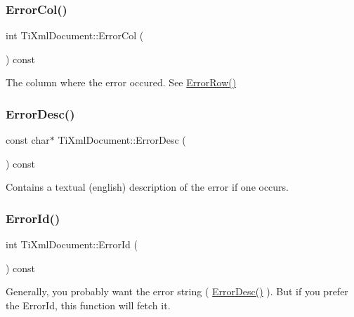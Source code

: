 \subsubsection{\texorpdfstring{Error\+Col()}{ErrorCol()}}
{\footnotesize\ttfamily int Ti\+Xml\+Document\+::\+Error\+Col (\begin{DoxyParamCaption}{ }\end{DoxyParamCaption}) const\hspace{0.3cm}{\ttfamily [inline]}}



The column where the error occured. See \hyperlink{class_ti_xml_document_a062e5257128a7da31b0b2e38cd524600}{Error\+Row()} 

\mbox{\label{class_ti_xml_document_aab511be262e84a003e3bb86f0215c8c2}} 
\subsubsection{\texorpdfstring{Error\+Desc()}{ErrorDesc()}}
{\footnotesize\ttfamily const char$\ast$ Ti\+Xml\+Document\+::\+Error\+Desc (\begin{DoxyParamCaption}{ }\end{DoxyParamCaption}) const\hspace{0.3cm}{\ttfamily [inline]}}



Contains a textual (english) description of the error if one occurs. 

\mbox{\label{class_ti_xml_document_abd928b49a646c8ed53e0453c555d96a2}} 
\subsubsection{\texorpdfstring{Error\+Id()}{ErrorId()}}
{\footnotesize\ttfamily int Ti\+Xml\+Document\+::\+Error\+Id (\begin{DoxyParamCaption}{ }\end{DoxyParamCaption}) const\hspace{0.3cm}{\ttfamily [inline]}}

Generally, you probably want the error string ( \hyperlink{class_ti_xml_document_aab511be262e84a003e3bb86f0215c8c2}{Error\+Desc()} ). But if you prefer the Error\+Id, this function will fetch it. \mbox{\label{class_ti_xml_document_a062e5257128a7da31b0b2e38cd524600}} 
